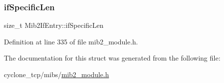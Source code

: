 \subsubsection{\texorpdfstring{if\+Specific\+Len}{ifSpecificLen}}
{\footnotesize\ttfamily size\+\_\+t Mib2\+If\+Entry\+::if\+Specific\+Len}



Definition at line 335 of file mib2\+\_\+module.\+h.



The documentation for this struct was generated from the following file\+:\begin{DoxyCompactItemize}
\item 
cyclone\+\_\+tcp/mibs/\hyperlink{mib2__module_8h}{mib2\+\_\+module.\+h}\end{DoxyCompactItemize}
